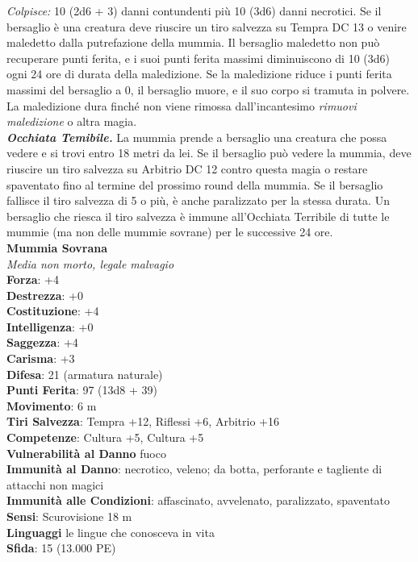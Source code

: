 \begin{multicols}{2}
\emph{Colpisce:} 10 (2d6 + 3) danni contundenti più 10 (3d6) danni necrotici. Se il bersaglio è una creatura deve riuscire un tiro salvezza su Tempra DC  13 o venire maledetto dalla putrefazione della mummia. Il bersaglio maledetto non può recuperare punti ferita, e i suoi punti ferita massimi diminuiscono di 10 (3d6) ogni 24 ore di durata della maledizione. Se la maledizione riduce i punti ferita massimi del bersaglio a 0, il bersaglio muore, e il suo corpo si tramuta in polvere. La maledizione dura finché non viene rimossa dall'incantesimo \emph{rimuovi maledizione} o altra magia.\\
\emph{\textbf{Occhiata Temibile.}} La mummia prende a bersaglio una creatura che possa vedere e si trovi entro 18 metri da lei. Se il bersaglio può vedere la mummia, deve riuscire un tiro salvezza su Arbitrio DC  12 contro questa magia o restare spaventato fino al termine del prossimo round della mummia. Se il bersaglio fallisce il tiro salvezza di 5 o più, è anche paralizzato per la stessa durata. Un bersaglio che riesca il tiro salvezza è immune all'Occhiata Terribile di tutte le mummie (ma non delle mummie sovrane) per le successive 24 ore.\\

\medskip\textbf{Mummia Sovrana}\\
\emph{Media non morto, legale malvagio}\\
\textbf{Forza}: +4\\
\textbf{Destrezza}: +0\\
\textbf{Costituzione}: +4\\
\textbf{Intelligenza}: +0\\
\textbf{Saggezza}: +4\\
\textbf{Carisma}: +3\\
\textbf{Difesa}: 21 (armatura naturale)\\
\textbf{Punti Ferita}: 97 (13d8 + 39)\\
\textbf{Movimento}: 6 m\\
\textbf{Tiri Salvezza}: Tempra +12, Riflessi +6, Arbitrio +16\\
\textbf{Competenze}: Cultura +5, Cultura +5\\
\textbf{Vulnerabilità al Danno} fuoco\\
\textbf{Immunità al Danno}: necrotico, veleno; da botta, perforante e tagliente di attacchi non magici\\
\textbf{Immunità alle Condizioni}: affascinato, avvelenato, paralizzato, spaventato\\
\textbf{Sensi}: Scurovisione 18 m\\
\textbf{Linguaggi} le lingue che conosceva in vita\\
\textbf{Sfida}: 15 (13.000 PE)\smallskip\\


\end{multicols}
